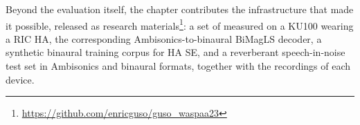 Beyond the evaluation itself, the chapter contributes the infrastructure that
made it possible, released as research
materials\footnote{\url{https://github.com/enricguso/guso_waspaa23}}: a set of
 measured on a \acrshort{KU100} wearing a \acrshort{RIC} \acrshort{HA}, 
the corresponding Ambisonics-to-binaural \acrshort{BiMagLS} decoder, a
synthetic binaural training corpus for \acrshort{HA} \acrshort{SE}, and a
reverberant speech-in-noise test set in Ambisonics and binaural formats, together
with the recordings of each device.